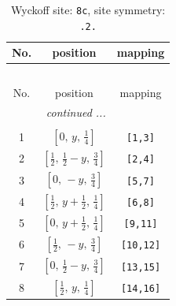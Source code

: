 \documentclass[fleqn,8pt]{jsarticle}
\begin{document}
\begin{longtable}{ccc}
\caption{Wyckoff site: {\tt 8c}, site symmetry: {\tt .2.}}
 \\
 \hline \hline
No. & position & mapping \\ \hline \endfirsthead

\multicolumn{2}{l}{\tablename\ \thetable{}} \\
 \hline \hline
No. & position & mapping \\ \hline \endhead

 \hline \hline
\multicolumn{2}{r}{\footnotesize\it continued ...} \\ \endfoot

 \hline \hline
\multicolumn{2}{r}{} \\ \endlastfoot

1 & $\left[ 0,\, y,\, \frac{1}{4} \right]$ & {\tt [1,3]} \\ \hline
2 & $\left[ \frac{1}{2},\, \frac{1}{2} - y,\, \frac{3}{4} \right]$ & {\tt [2,4]} \\ \hline
3 & $\left[ 0,\, - y,\, \frac{3}{4} \right]$ & {\tt [5,7]} \\ \hline
4 & $\left[ \frac{1}{2},\, y + \frac{1}{2},\, \frac{1}{4} \right]$ & {\tt [6,8]} \\ \hline
5 & $\left[ 0,\, y + \frac{1}{2},\, \frac{1}{4} \right]$ & {\tt [9,11]} \\ \hline
6 & $\left[ \frac{1}{2},\, - y,\, \frac{3}{4} \right]$ & {\tt [10,12]} \\ \hline
7 & $\left[ 0,\, \frac{1}{2} - y,\, \frac{3}{4} \right]$ & {\tt [13,15]} \\ \hline
8 & $\left[ \frac{1}{2},\, y,\, \frac{1}{4} \right]$ & {\tt [14,16]} \\
\end{longtable}
\renewcommand{\arraystretch}{1.2}
\end{document}
